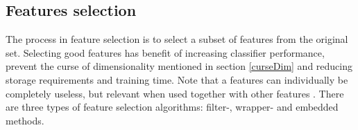 \documentclass[USenglish]{ifimaster}  %
\begin{document}
	
	
	
\subsection{Features selection}\label{selection}	
The process in feature selection is to select a subset of features from the original set. Selecting good features has benefit of increasing classifier performance, prevent the curse of dimensionality mentioned in section \ref{curseDim} and reducing storage requirements and training time. Note that a features can individually be completely useless, but relevant when used together with other features \cite{Guyon2006}. There are three types of feature selection algorithms: filter-, wrapper- and embedded methods. %
	

	
\end{document}
